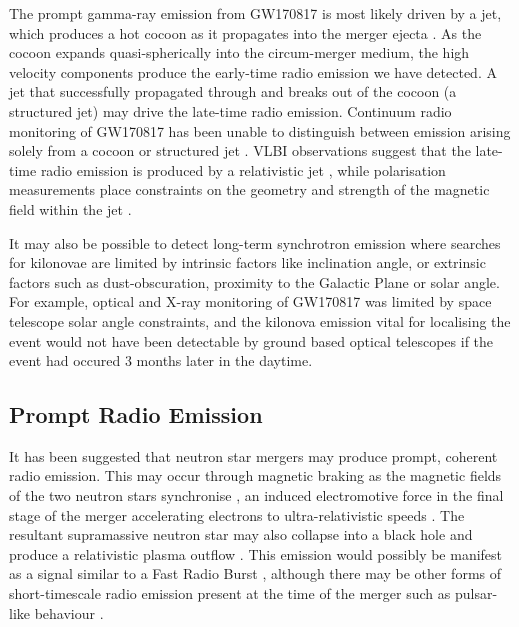 The prompt gamma-ray emission from GW170817 is most likely driven by a jet, which produces a hot cocoon as it propagates into the merger ejecta \citep{2018MNRAS.473..576G}. As the cocoon expands quasi-spherically into the circum-merger medium, the high velocity components produce the early-time radio emission we have detected. A jet that successfully propagated through and breaks out of the cocoon (a structured jet) may drive the late-time radio emission. Continuum radio monitoring of GW170817 has been unable to distinguish between emission arising solely from a cocoon or structured jet \citep{2018MNRAS.478..407N}. VLBI observations suggest that the late-time radio emission is produced by a relativistic jet \citep{2018Natur.561..355M}, while polarisation measurements place constraints on the geometry and strength of the magnetic field within the jet \citep{2018ApJ...861L..10C}.

\pagebreak
It may also be possible to detect long-term synchrotron emission where searches for kilonovae are limited by intrinsic factors like inclination angle, or extrinsic factors such as dust-obscuration, proximity to the Galactic Plane or solar angle. For example, optical and X-ray monitoring of GW170817 was limited by space telescope solar angle constraints, and the kilonova emission vital for localising the event would not have been detectable by ground based optical telescopes if the event had occured 3 months later in the daytime.

\subsection{Prompt Radio Emission}
It has been suggested that neutron star mergers may produce prompt, coherent radio emission. This may occur through magnetic braking as the magnetic fields of the two neutron stars synchronise \citep{2013PASJ...65L..12T}, an induced electromotive force in the final stage of the merger accelerating electrons to ultra-relativistic speeds \citep{2016ApJ...822L...7W}. The resultant supramassive neutron star may also collapse into a black hole \citep{2014ApJ...780L..21Z,2014A&A...562A.137F} and produce a relativistic plasma outflow \citep{2010Ap&SS.330...13P}. This emission would possibly be manifest as a signal similar to a Fast Radio Burst \citep[FRB,][]{2007Sci...318..777L,2013Sci...341...53T}, although there may be other forms of short-timescale radio emission present at the time of the merger such as pulsar-like behaviour \citep{1996A&A...312..937L}.

